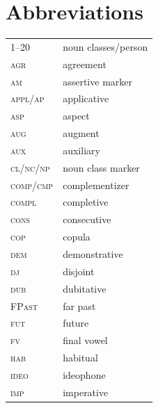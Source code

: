 \documentclass[output=paper,colorlinks,citecolor=brown,
]{langscibook}
\begin{document}
\section*{Abbreviations}\label{sec:gluckman:abbrev}

\begin{tabularx}{.45\textwidth}{lQ}
    1--20 &  noun classes/person\\
    \textsc{agr} &  agreement\\
    \textsc{am} &  assertive marker\\
    \textsc{appl/ap} &  applicative\\
    \textsc{asp} &  aspect\\
    \textsc{aug} &  augment\\
    \textsc{aux} &  auxiliary\\
    \textsc{cl/nc/np} &  noun class marker\\
    \textsc{comp/cmp} &  complementizer\\
    \textsc{compl} &  completive\\
    \textsc{cons} &  consecutive\\
    \textsc{cop} &  copula\\
    \textsc{dem} &  demonstrative\\
    \textsc{dj} &  disjoint\\
    \textsc{dub} &  dubitative\\
    \textsc{FPast} &  far past\\
    \textsc{fut} &  future\\
    \textsc{fv} &  final vowel\\
    \textsc{hab} &  habitual\\
    \textsc{ideo} &  ideophone\\
    \textsc{imp} &  imperative\\
    \end{tabularx}
\end{document}
